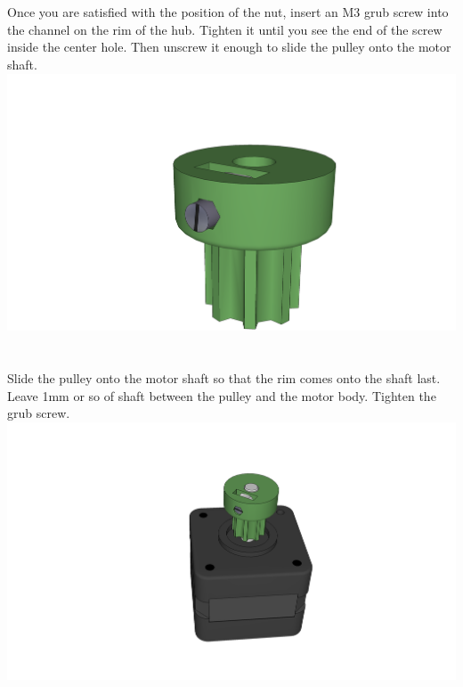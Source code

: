 \documentclass[twoside,openany,a4paper,titlepage]{memoir}
\begin{document}
	\section{}
	Once you are satisfied with the position of the nut, insert an M3 grub screw into the channel on the rim
	of the hub. Tighten it until you see the end of the screw inside the center hole. Then unscrew it enough
	to slide the pulley onto the motor shaft.\\
	\includegraphics[width=1\linewidth]{graphics/ch9_3.png}
	
	\section{}
	Slide the pulley onto the motor shaft so that the rim comes onto the shaft last. Leave 1mm or so of shaft
	between the pulley and the motor body. Tighten the grub screw.\\
	\includegraphics[width=1\linewidth]{graphics/ch9_4.png}
	
\end{document}
